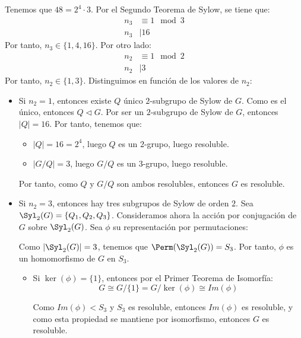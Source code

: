 \begin{ejercicio}
\begin{enumerate}
        Tenemos que $48=2^4\cdot 3$. Por el Segundo Teorema de Sylow, se tiene que:
        \begin{align*}
            n_3 &\equiv 1 \mod 3 \\
            n_3 &\mid 16
        \end{align*}
        Por tanto, $n_3\in \{1,4,16\}$. Por otro lado:
        \begin{align*}
            n_2 &\equiv 1 \mod 2 \\
            n_2 &\mid 3
        \end{align*}
        Por tanto, $n_2\in \{1,3\}$.
        Distinguimos en función de los valores de $n_2$:
        \begin{itemize}
            \item Si $n_2=1$, entonces existe $Q$ único $2$-subgrupo de Sylow de $G$. Como es el único, entonces $Q\lhd G$. Por ser un $2$-subgrupo de Sylow de $G$, entonces $|Q|=16$. Por tanto, tenemos que:
            \begin{itemize}
                \item $|Q|=16=2^4$, luego $Q$ es un $2$-grupo, luego resoluble.
                \item $|G/Q|=3$, luego $G/Q$ es un $3$-grupo, luego resoluble.
            \end{itemize}
            Por tanto, como $Q$ y $G/Q$ son ambos resolubles, entonces $G$ es resoluble.

            \item Si $n_2=3$, entonces hay tres subgrupos de Sylow de orden $2$. Sea $\Syl_2(G)=\{Q_1,Q_2,Q_3\}$. Consideramos ahora la acción por conjugación de $G$ sobre $\Syl_2(G)$. Sea $\phi$ su representación por permutaciones:

            Como $|\Syl_2(G)|=3$, tenemos que $\Perm(\Syl_2(G))=S_3$. Por tanto, $\phi$ es un homomorfismo de $G$ en $S_3$.
            \begin{itemize}
                \item Si $\ker(\phi)=\{1\}$, entonces por el Primer Teorema de Isomorfía:
                \begin{equation*}
                    G \cong G/\{1\} = G/\ker(\phi) \cong Im(\phi)
                \end{equation*}

                Como $Im(\phi)< S_3$ y $S_3$ es resoluble, entonces $Im(\phi)$ es resoluble, y como esta propiedad se mantiene por isomorfismo, entonces $G$ es resoluble.


\end{itemize}
\end{itemize}
\end{enumerate}
\end{ejercicio}
